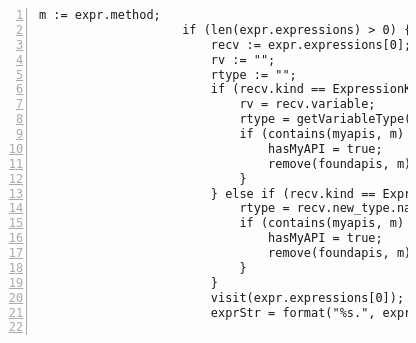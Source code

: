 \begin{figure}[ht!]
\begin{lstlisting}[numbers=left, tabsize=4, escapechar=@, caption={API Usage Mining Analysis},label={lst:aun-code}, lastline = 10]
                    m := expr.method;
                    if (len(expr.expressions) > 0) {
                        recv := expr.expressions[0];  
                        rv := ""; 
                        rtype := "";
                        if (recv.kind == ExpressionKind.VARACCESS) {
                            rv = recv.variable;
                            rtype = getVariableType(rv, true);
                            if (contains(myapis, m) && rtype != "") {
                                hasMyAPI = true;
                                remove(foundapis, m);
                            }
                        } else if (recv.kind == ExpressionKind.NEW) {
                            rtype = recv.new_type.name;
                            if (contains(myapis, m) && isAPIConstructor(recv.new_type.name)) {
                                hasMyAPI = true;    
                                remove(foundapis, m);
                            }
                        }
                        visit(expr.expressions[0]);
                        exprStr = format("%s.", exprStr);
                        

\end{lstlisting}
\end{figure}
